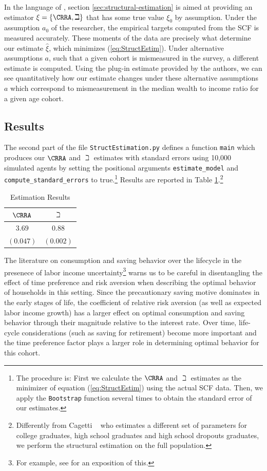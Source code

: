 \documentclass[titlepage, headings=optiontotocandhead]{econtex}
\begin{document}
In the language of \cite{andrews2017measuring}, section \ref{sec:structural-estimation} is aimed at providing an estimator $\xi =\{\CRRA ,\beth\}$ that has some true value $\xi_0 $ by assumption. Under the assumption $a_0$ of the researcher, the empirical targets computed from the SCF is measured accurately. These moments of the data are precisely what determine our estimate $\hat{\xi}$, which minimizes (\ref{eq:StructEstim}). Under alternative assumptions $a$, such that a given cohort is mismeasured in the survey, a different estimate is computed. Using the plug-in estimate provided by the authors, we can see quantitatively how our estimate changes under these alternative assumptions $a$ which correspond to mismeasurement in the median wealth to income ratio for a given age cohort.

\subsection{Results}
The second part of the file \texttt{StructEstimation.py}
defines a function \texttt{main} which produces our $\CRRA$ and
$\beth$ estimates with standard errors using 10,000 simulated
agents by setting the positional arguments \texttt{estimate\_model} and
\texttt{compute\_standard\_errors} to true.\footnote{The procedure is: First we calculate the $\CRRA$ and
  $\beth$ estimates as the minimizer of equation
  (\ref{eq:StructEstim}) using the actual SCF data. Then, we apply the
  \texttt{Bootstrap} function several times to obtain the standard
  error of our estimates.} Results are reported in Table
\ref{tab:EstResults}.\footnote{Differently from Cagetti
  ~\citeyearpar{cagettiWprofiles} who estimates a different set of
  parameters for college graduates, high school graduates and high
  school dropouts graduates, we perform the structural estimation on
  the full population.}


  \begin{table}[h]
    \caption{Estimation Results}\label{tab:EstResults}
    \center
    \begin{tabular}{cc}
      \hline
      $\CRRA $ & $\beth$\\
      \hline
      $3.69$ & $0.88$\\
      $(0.047)$ & $(0.002)$\\
      \hline
    \end{tabular}
  \end{table}

The literature on consumption and saving behavior over the lifecycle in the presenece of labor income uncertainty\footnote{For example, see \cite{gpLifecycle} for an exposition of this.} warns us to be careful in disentangling the effect of time preference and risk aversion when describing the optimal behavior of households in this setting.  Since the precautionary saving motive dominates in the early stages of life, the coefficient of relative risk aversion (as well as expected labor income growth) has a larger effect on optimal consumption and saving behavior through their magnitude relative to the interest rate. Over time, life-cycle considerations (such as saving for retirement) become more important and the time preference factor plays a larger role in determining optimal behavior for this cohort.
\end{document}
